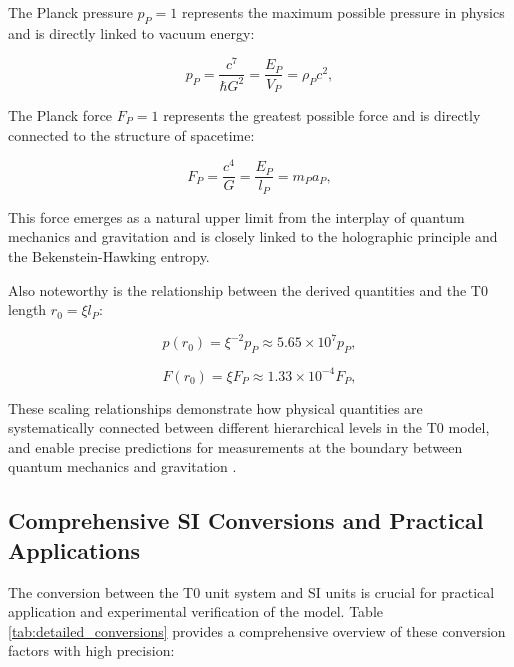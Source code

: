 \documentclass[twocolumn,aps,prl]{revtex4-2}
\begin{document}
	The Planck pressure $p_P = 1$ represents the maximum possible pressure in physics and is directly linked to vacuum energy:
	
	\begin{equation}
		p_P = \frac{c^7}{\hbar G^2} = \frac{E_P}{V_P} = \rho_P c^2, \label{eq:planck_pressure}
	\end{equation}
	
	The Planck force $F_P = 1$ represents the greatest possible force and is directly connected to the structure of spacetime:
	
	\begin{equation}
		F_P = \frac{c^4}{G} = \frac{E_P}{l_P} = m_P a_P, \label{eq:planck_force}
	\end{equation}
	
	This force emerges as a natural upper limit from the interplay of quantum mechanics and gravitation and is closely linked to the holographic principle and the Bekenstein-Hawking entropy.
	
	Also noteworthy is the relationship between the derived quantities and the T0 length $r_0 = \xi l_P$:
	
	\begin{equation}
		p(r_0) = \xi^{-2} p_P \approx 5.65 \times 10^7 p_P, \label{eq:r0_pressure}
	\end{equation}
	
	\begin{equation}
		F(r_0) = \xi F_P \approx 1.33 \times 10^{-4} F_P, \label{eq:r0_force}
	\end{equation}
	
	These scaling relationships demonstrate how physical quantities are systematically connected between different hierarchical levels in the T0 model, and enable precise predictions for measurements at the boundary between quantum mechanics and gravitation \cite{pascher_emergente_2025}.
	
	\subsection{Comprehensive SI Conversions and Practical Applications}
	\label{subsec:detailed_conversions}
	
	The conversion between the T0 unit system and SI units is crucial for practical application and experimental verification of the model. Table \ref{tab:detailed_conversions} provides a comprehensive overview of these conversion factors with high precision:
	
\end{document}
